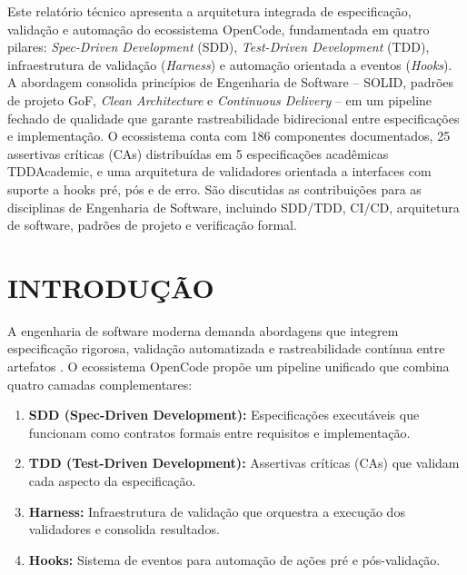 \documentclass[
  brazil,
  sumario=tradicional,
  10pt
]{abntex2}
\begin{document}
\resumo
  Este relatório técnico apresenta a arquitetura integrada de especificação,
  validação e automação do ecossistema OpenCode, fundamentada em quatro pilares:
  \textit{Spec-Driven Development} (SDD), \textit{Test-Driven Development} (TDD),
  infraestrutura de validação (\textit{Harness}) e automação orientada a eventos
  (\textit{Hooks}). A abordagem consolida princípios de Engenharia de Software --
  SOLID, padrões de projeto GoF, \textit{Clean Architecture} e \textit{Continuous
  Delivery} -- em um pipeline fechado de qualidade que garante rastreabilidade
  bidirecional entre especificações e implementação. O ecossistema conta com 186
  componentes documentados, 25 assertivas críticas (CAs) distribuídas em 5
  especificações acadêmicas TDDAcademic, e uma arquitetura de validadores
  orientada a interfaces com suporte a hooks pré, pós e de erro. São discutidas
  as contribuições para as disciplinas de Engenharia de Software, incluindo
  SDD/TDD, CI/CD, arquitetura de software, padrões de projeto e verificação
  formal.
\endresumo

\section{INTRODUÇÃO}

A engenharia de software moderna demanda abordagens que integrem
especificação rigorosa, validação automatizada e rastreabilidade contínua
entre artefatos \cite{sommerville2011engenharia, pressman2016engenharia}.
O ecossistema OpenCode propõe um pipeline unificado que combina quatro
camadas complementares:

\begin{enumerate}
  \item \textbf{SDD (Spec-Driven Development):} Especificações executáveis
    que funcionam como contratos formais entre requisitos e implementação.
  \item \textbf{TDD (Test-Driven Development):} Assertivas críticas (CAs)
    que validam cada aspecto da especificação.
  \item \textbf{Harness:} Infraestrutura de validação que orquestra a
    execução dos validadores e consolida resultados.
  \item \textbf{Hooks:} Sistema de eventos para automação de ações
    pré e pós-validação.
\end{enumerate}
\end{document}
